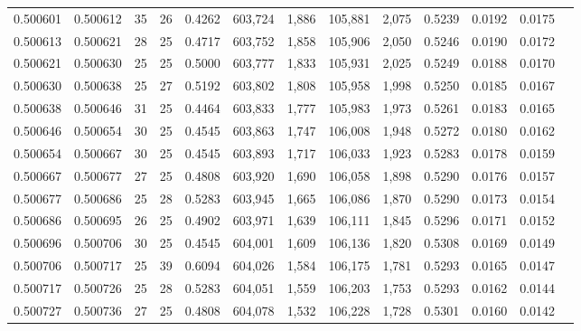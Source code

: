 \begin{tabular}{rrrrrrrrrrrrr}
0.500601 & 0.500612 &    35 &  26 &                                     0.4262 & 603,724 &   1,886 & 105,881 &   2,075 & 0.5239 & 0.0192 & 0.0175 \\
0.500613 & 0.500621 &    28 &  25 &                                     0.4717 & 603,752 &   1,858 & 105,906 &   2,050 & 0.5246 & 0.0190 & 0.0172 \\
0.500621 & 0.500630 &    25 &  25 &                                     0.5000 & 603,777 &   1,833 & 105,931 &   2,025 & 0.5249 & 0.0188 & 0.0170 \\
0.500630 & 0.500638 &    25 &  27 &                                     0.5192 & 603,802 &   1,808 & 105,958 &   1,998 & 0.5250 & 0.0185 & 0.0167 \\
0.500638 & 0.500646 &    31 &  25 &                                     0.4464 & 603,833 &   1,777 & 105,983 &   1,973 & 0.5261 & 0.0183 & 0.0165 \\
0.500646 & 0.500654 &    30 &  25 &                                     0.4545 & 603,863 &   1,747 & 106,008 &   1,948 & 0.5272 & 0.0180 & 0.0162 \\
0.500654 & 0.500667 &    30 &  25 &                                     0.4545 & 603,893 &   1,717 & 106,033 &   1,923 & 0.5283 & 0.0178 & 0.0159 \\
0.500667 & 0.500677 &    27 &  25 &                                     0.4808 & 603,920 &   1,690 & 106,058 &   1,898 & 0.5290 & 0.0176 & 0.0157 \\
0.500677 & 0.500686 &    25 &  28 &                                     0.5283 & 603,945 &   1,665 & 106,086 &   1,870 & 0.5290 & 0.0173 & 0.0154 \\
0.500686 & 0.500695 &    26 &  25 &                                     0.4902 & 603,971 &   1,639 & 106,111 &   1,845 & 0.5296 & 0.0171 & 0.0152 \\
0.500696 & 0.500706 &    30 &  25 &                                     0.4545 & 604,001 &   1,609 & 106,136 &   1,820 & 0.5308 & 0.0169 & 0.0149 \\
0.500706 & 0.500717 &    25 &  39 &                                     0.6094 & 604,026 &   1,584 & 106,175 &   1,781 & 0.5293 & 0.0165 & 0.0147 \\
0.500717 & 0.500726 &    25 &  28 &                                     0.5283 & 604,051 &   1,559 & 106,203 &   1,753 & 0.5293 & 0.0162 & 0.0144 \\
0.500727 & 0.500736 &    27 &  25 &                                     0.4808 & 604,078 &   1,532 & 106,228 &   1,728 & 0.5301 & 0.0160 & 0.0142 \\

\end{tabular}
